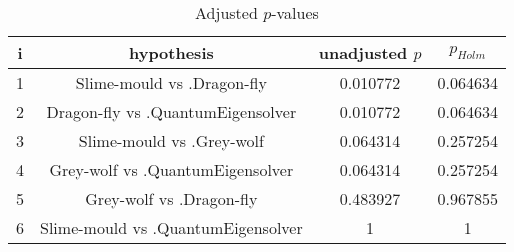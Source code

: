 \documentclass[a4paper,10pt]{article}
\begin{document}
\begin{landscape}
\begin{table}[!htp]
\centering\scriptsize
\begin{tabular}{cccc}
i&hypothesis&unadjusted $p$&$p_{Holm}$\\
\hline1&Slime-mould vs .Dragon-fly&0.010772&0.064634\\
2&Dragon-fly vs .QuantumEigensolver&0.010772&0.064634\\
3&Slime-mould vs .Grey-wolf&0.064314&0.257254\\
4&Grey-wolf vs .QuantumEigensolver&0.064314&0.257254\\
5&Grey-wolf vs .Dragon-fly&0.483927&0.967855\\
6&Slime-mould vs .QuantumEigensolver&1&1\\
\hline
\end{tabular}
\caption{Adjusted $p$-values}
\end{table}

\end{landscape}
\end{document}
